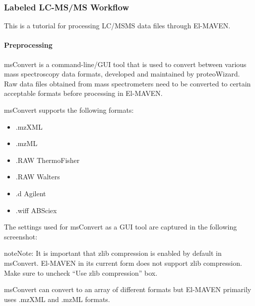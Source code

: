 \documentclass[letterpaper,10pt,english,openany,oneside]{sphinxmanual}
\begin{document}


\subsubsection{Labeled LC-MS/MS Workflow}
\label{\detokenize{LabeledLCMSMSWorkflow:labeled-lc-ms-ms-workflow}}\label{\detokenize{LabeledLCMSMSWorkflow::doc}}
This is a tutorial for processing LC/MSMS data files through El-MAVEN.


\paragraph{Preprocessing}
\label{\detokenize{LabeledLCMSMSWorkflow:preprocessing}}
msConvert is a command-line/GUI tool that is used to convert between various mass spectroscopy data formats, developed and maintained by proteoWizard. Raw data files obtained from mass spectrometers need to be converted to certain acceptable formats before processing in El-MAVEN.


msConvert supports the following formats:
\begin{itemize}
\item {} 
.mzXML

\item {} 
.mzML

\item {} 
.RAW ThermoFisher

\item {} 
.RAW Walters

\item {} 
.d Agilent

\item {} 
.wiff ABSciex

\end{itemize}

The settings used for msConvert as a GUI tool are captured in the following screenshot:


\begin{sphinxadmonition}{note}{Note:}
It is important that zlib compression is enabled by default in msConvert. El-MAVEN in its current form does not support zlib compression. Make sure to uncheck “Use zlib compression” box.
\end{sphinxadmonition}


msConvert can convert to an array of different formats but El-MAVEN primarily uses .mzXML and .mzML formats.
\end{document}
